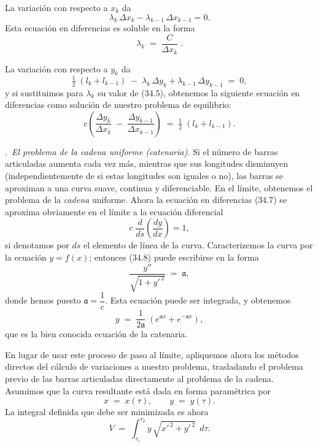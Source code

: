 La variación con respecto a $x_k$ da
\begin{equation}
\lambda_k\,\Delta x_k - \lambda_{k-1}\,\Delta x_{k-1} = 0. \tag{34.4}
\end{equation}
Esta ecuación en diferencias es soluble en la forma
\begin{equation}
\lambda_k \;=\; \frac{C}{\Delta x_k}\;. \tag{34.5}
\end{equation}

La variación con respecto a $y_k$ da
\begin{equation}
\tfrac{1}{2}\;(l_k + l_{k-1}) \;-\; \lambda_k\,\Delta y_k + \lambda_{k-1}\,\Delta y_{k-1} \;=\; 0, \tag{34.6}
\end{equation}
y si sustituimos para $\lambda_k$ su valor de (34.5), obtenemos la siguiente ecuación en diferencias como solución de nuestro problema de equilibrio:
\begin{equation}
c\left(\frac{\Delta y_k}{\Delta x_k} \;-\; \frac{\Delta y_{k-1}}{\Delta x_{k-1}}\right) \;=\; \tfrac{1}{2}\;(l_k + l_{k-1}). \tag{34.7}
\end{equation}

\medskip
{}.\ \textit{El problema de la cadena uniforme (catenaria).} Si el número de barras articuladas aumenta cada vez más, mientras que sus longitudes disminuyen (independientemente de si estas longitudes son iguales o no), las barras se aproximan a una curva suave, continua y diferenciable. En el límite, obtenemos el problema de la \emph{cadena} uniforme. Ahora la ecuación en diferencias (34.7) se aproxima obviamente en el límite a la ecuación diferencial
\begin{equation}
c\;\frac{d}{ds}\!\left(\frac{dy}{dx}\right) = 1, \tag{34.8}
\end{equation}
si denotamos por $ds$ el elemento de línea de la curva. Caracterizemos la curva por la ecuación $y = f(x)$; entonces (34.8) puede escribirse en la forma
\begin{equation}
\frac{y''}{\sqrt{1 + y'^{\,2}}} \;=\; \mathfrak{a}, \tag{34.9}
\end{equation}
donde hemos puesto $\mathfrak{a} = \dfrac{1}{c}$. Esta ecuación puede ser integrada, y obtenemos
\begin{equation}
y \;=\; \frac{1}{2\mathfrak{a}}\;(e^{\mathfrak{a}x} + e^{-\mathfrak{a}x}), \tag{34.10}
\end{equation}
que es la bien conocida ecuación de la catenaria.

En lugar de usar este proceso de paso al límite, apliquemos ahora los métodos directos del cálculo de variaciones a nuestro problema, trasladando el problema previo de las barras articuladas directamente al problema de la cadena. Asumimos que la curva resultante está dada en forma paramétrica por
\begin{equation}
x \;=\; x(\tau), \qquad y \;=\; y(\tau). \tag{34.11}
\end{equation}
La integral definida que debe ser minimizada es ahora
\begin{equation}
V \;=\; \int_{\tau_1}^{\tau_2} y\,\sqrt{x'^{\,2} + y'^{\,2}}\;\,d\tau. \tag{34.12}
\end{equation}

